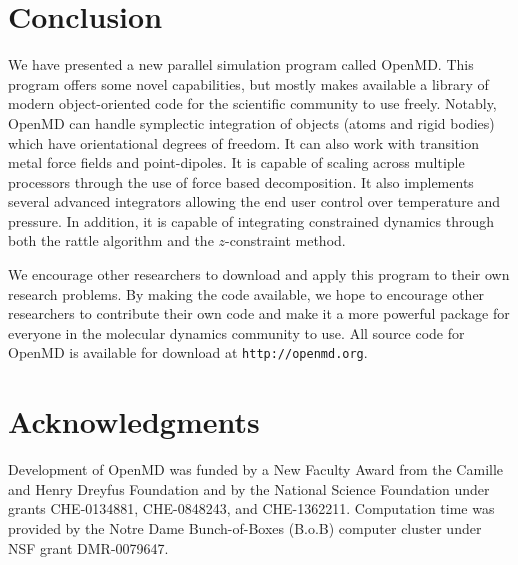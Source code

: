 \documentclass[]{book}
\begin{document}
\chapter{\label{section:conclusion}Conclusion}

We have presented a new parallel simulation program called {\sc
OpenMD}. This program offers some novel capabilities, but mostly makes
available a library of modern object-oriented code for the scientific
community to use freely.  Notably, {\sc OpenMD} can handle symplectic
integration of objects (atoms and rigid bodies) which have
orientational degrees of freedom.  It can also work with transition
metal force fields and point-dipoles. It is capable of scaling across
multiple processors through the use of force based decomposition. It
also implements several advanced integrators allowing the end user
control over temperature and pressure. In addition, it is capable of
integrating constrained dynamics through both the {\sc rattle}
algorithm and the $z$-constraint method.

We encourage other researchers to download and apply this program to
their own research problems.  By making the code available, we hope to
encourage other researchers to contribute their own code and make it a
more powerful package for everyone in the molecular dynamics community
to use.  All source code for {\sc OpenMD} is available for download at
{\tt http://openmd.org}.

\chapter{Acknowledgments}

Development of {\sc OpenMD} was funded by a New Faculty Award from the
Camille and Henry Dreyfus Foundation and by the National Science
Foundation under grants CHE-0134881, CHE-0848243, and
CHE-1362211. Computation time was provided by the Notre Dame
Bunch-of-Boxes (B.o.B) computer cluster under NSF grant DMR-0079647.



\end{document}
